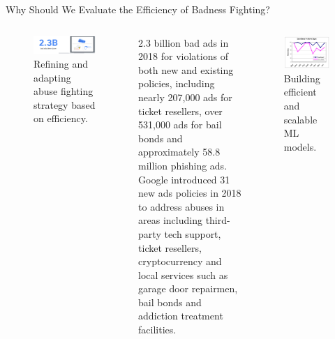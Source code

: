 \documentclass[nobackground,dvipsnames,table]{beamer}
\begin{document}
\begin{frame}{Why Should We Evaluate the Efficiency of Badness Fighting?}
    \begin{columns}[T]
            \begin{figure}
                \centering
                \caption{Refining and adapting abuse fighting strategy based on efficiency.}
                \includegraphics[width=\textwidth]{bad-ads-taken-down}
            \end{figure}
            \tiny
            2.3 billion bad ads in 2018 for violations of both new and existing policies, including nearly 207,000 ads for ticket resellers, over 531,000 ads for bail bonds and approximately 58.8 million phishing ads. \\

            Google  introduced 31 new ads policies in 2018 to address abuses in areas including third-party tech support, ticket resellers, cryptocurrency and local services such as garage door repairmen, bail bonds and addiction treatment facilities.
            \begin{figure}
                \centering
                \caption{Building efficient and scalable ML models.}
                \includegraphics[width=\textwidth]{case-based-vs-naive-bayes}
            \end{figure}
    \end{columns}
\end{frame}
\end{document}
